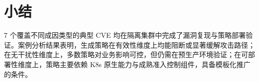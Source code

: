 














\section{小结}
7 个覆盖不同成因类型的典型 CVE 均在隔离集群中完成了漏洞复现与策略部署验证。案例分析结果表明，生成策略在有效性维度上均能阻断或显著缓解攻击路径；在无干扰性维度上，多数策略对业务影响可控，但仍需在预生产环境验证；在可部署性维度上，策略主要依赖 K8s 原生能力与成熟准入控制组件，具备模板化推广的条件。
